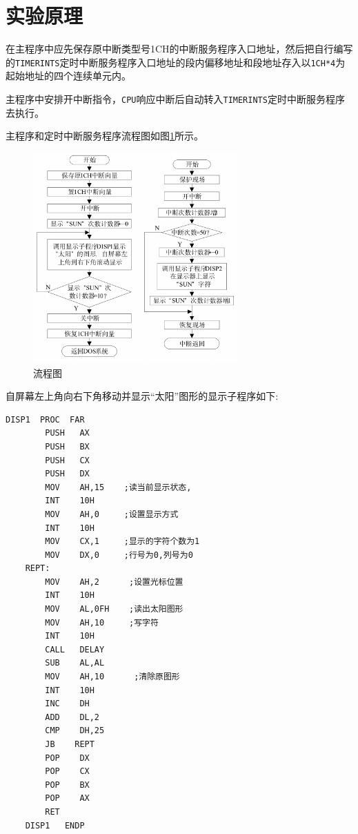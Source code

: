 \documentclass[11pt]{SEU-Digital-Report}
\begin{document}
\section{实验原理}
在主程序中应先保存原中断类型号1CH的中断服务程序入口地址，然后把自行编写的\texttt{TIMERINTS}定时中断服务程序入口地址的段内偏移地址和段地址存入以\texttt{1CH*4}为起始地址的四个连续单元内。

主程序中安排开中断指令，\texttt{CPU}响应中断后自动转入\texttt{TIMERINTS}定时中断服务程序去执行。    

主程序和定时中断服务程序流程图如图\ref{fig:process}所示。

\begin{figure}[htbp]
    \centering
    \includegraphics[width=0.7\textwidth]{fig/process.png}
    \caption{流程图}
    \label{fig:process}
\end{figure}

自屏幕左上角向右下角移动并显示“太阳”图形的显示子程序如下: 
\begin{lstlisting}[language={[x86masm]Assembler},title=code]
    DISP1  PROC  FAR
        PUSH   AX
        PUSH   BX
        PUSH   CX
        PUSH   DX
        MOV    AH,15    ;读当前显示状态,
        INT    10H
        MOV    AH,0     ;设置显示方式
        INT    10H
        MOV    CX,1     ;显示的字符个数为1
        MOV    DX,0     ;行号为0,列号为0
    REPT: 
        MOV    AH,2      ;设置光标位置
        INT    10H
        MOV    AL,0FH    ;读出太阳图形
        MOV    AH,10     ;写字符
        INT    10H
        CALL   DELAY
        SUB    AL,AL
        MOV    AH,10      ;清除原图形
        INT    10H
        INC    DH
        ADD    DL,2
        CMP    DH,25
        JB    REPT
        POP    DX
        POP    CX
        POP    BX
        POP    AX    
        RET
    DISP1   ENDP
\end{lstlisting}
\end{document}
